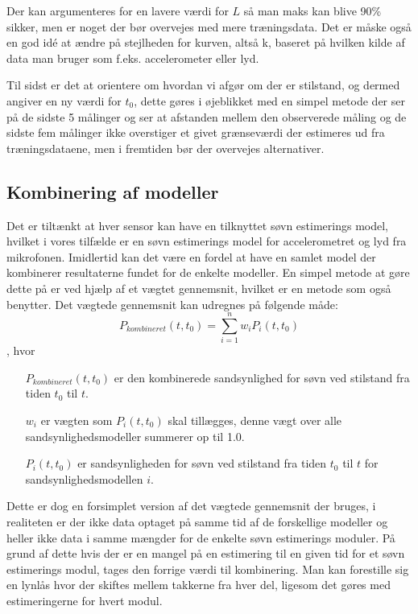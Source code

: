 Der kan argumenteres for en lavere værdi for $L$ så man maks kan blive 90\% sikker, men er noget der bør overvejes med mere træningsdata. Det er måske også en god idé at ændre på stejlheden for kurven, altså k, baseret på hvilken kilde af data man bruger som f.eks. accelerometer eller lyd.

Til sidst er det at orientere om hvordan vi afgør om der er stilstand, og dermed angiver en ny værdi for $t_0$, dette gøres i øjeblikket med en simpel metode der ser på de sidste 5 målinger og ser at afstanden mellem den observerede måling og de sidste fem målinger ikke overstiger et givet grænseværdi der estimeres ud fra træningsdataene, men i fremtiden bør der overvejes alternativer.

\subsection{Kombinering af modeller}
Det er tiltænkt at hver sensor kan have en tilknyttet søvn estimerings model, hvilket i vores tilfælde er en søvn estimerings model for accelerometret og lyd fra mikrofonen.
Imidlertid kan det være en fordel at have en samlet model der kombinerer resultaterne fundet for de enkelte modeller.
En simpel metode at gøre dette på er ved hjælp af et vægtet gennemsnit, hvilket er en metode som \citet{6563918} også benytter.
Det vægtede gennemsnit kan udregnes på følgende måde:
\begin{equation}
	P_{kombineret}(t,t_0) = \sum_{i=1}^{n}{w_iP_i(t,t_0)}
\end{equation}
, hvor
\begin{itemize}
	\item[$P_{kombineret}(t,t_0)$] er den kombinerede sandsynlighed for søvn ved stilstand fra tiden $t_0$ til $t$.
	\item[$w_i$] er vægten som $P_i(t,t_0)$ skal tillægges, denne vægt over alle sandsynlighedsmodeller summerer op til 1.0.
	\item[$P_i(t,t_0)$] er sandsynligheden for søvn ved stilstand fra tiden $t_0$ til $t$ for sandsynlighedsmodellen $i$.
\end{itemize}

Dette er dog en forsimplet version af det vægtede gennemsnit der bruges, i realiteten er der ikke data optaget på samme tid af de forskellige modeller og heller ikke data i samme mængder for de enkelte søvn estimerings moduler.
På grund af dette hvis der er en mangel på en estimering til en given tid for et søvn estimerings modul, tages den forrige værdi til kombinering.
Man kan forestille sig en lynlås hvor der skiftes mellem takkerne fra hver del, ligesom det gøres med estimeringerne for hvert modul.

